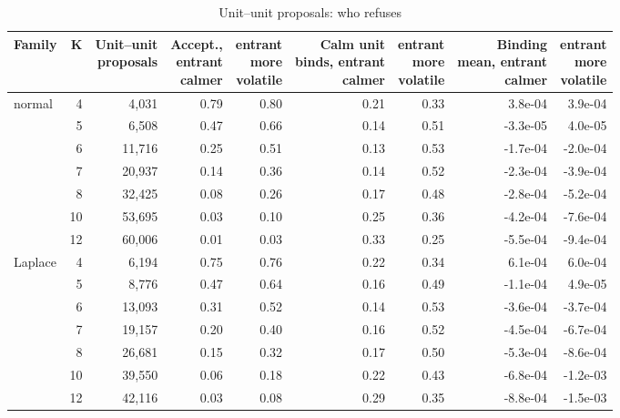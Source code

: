 \begin{table}
\centering
\caption{Unit--unit proposals: who refuses}
\label{tab:a6b_unit_unit}
\small
\begin{tabular}{lrrrrrrrr}
\toprule
Family & K & \makecell[b]{Unit--unit\\{}proposals} & \makecell[b]{Accept.,\\{}entrant\\{}calmer} & \makecell[b]{entrant\\{}more\\{}volatile} & \makecell[b]{Calm unit\\{}binds, entrant\\{}calmer} & \makecell[b]{entrant\\{}more\\{}volatile} & \makecell[b]{Binding\\{}mean, entrant\\{}calmer} & \makecell[b]{entrant\\{}more\\{}volatile} \\
\midrule
normal & 4 & 4,031 & 0.79 & 0.80 & 0.21 & 0.33 & 3.8e-04 & 3.9e-04 \\
 & 5 & 6,508 & 0.47 & 0.66 & 0.14 & 0.51 & -3.3e-05 & 4.0e-05 \\
 & 6 & 11,716 & 0.25 & 0.51 & 0.13 & 0.53 & -1.7e-04 & -2.0e-04 \\
 & 7 & 20,937 & 0.14 & 0.36 & 0.14 & 0.52 & -2.3e-04 & -3.9e-04 \\
 & 8 & 32,425 & 0.08 & 0.26 & 0.17 & 0.48 & -2.8e-04 & -5.2e-04 \\
 & 10 & 53,695 & 0.03 & 0.10 & 0.25 & 0.36 & -4.2e-04 & -7.6e-04 \\
 & 12 & 60,006 & 0.01 & 0.03 & 0.33 & 0.25 & -5.5e-04 & -9.4e-04 \\
Laplace & 4 & 6,194 & 0.75 & 0.76 & 0.22 & 0.34 & 6.1e-04 & 6.0e-04 \\
 & 5 & 8,776 & 0.47 & 0.64 & 0.16 & 0.49 & -1.1e-04 & 4.9e-05 \\
 & 6 & 13,093 & 0.31 & 0.52 & 0.14 & 0.53 & -3.6e-04 & -3.7e-04 \\
 & 7 & 19,157 & 0.20 & 0.40 & 0.16 & 0.52 & -4.5e-04 & -6.7e-04 \\
 & 8 & 26,681 & 0.15 & 0.32 & 0.17 & 0.50 & -5.3e-04 & -8.6e-04 \\
 & 10 & 39,550 & 0.06 & 0.18 & 0.22 & 0.43 & -6.8e-04 & -1.2e-03 \\
 & 12 & 42,116 & 0.03 & 0.08 & 0.29 & 0.35 & -8.8e-04 & -1.5e-03 \\

\end{tabular}
\end{table}
